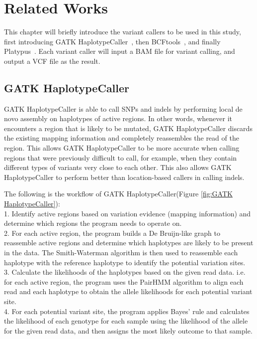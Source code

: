 \documentclass[PhD]{PHlab-thesis}
\begin{document}
\chapter{Related Works}
This chapter will briefly introduce the variant callers to be used in this study, first introducing GATK HaplotypeCaller~\cite{Poplin2018GH}, then BCFtools~\cite{Danecek2021BCFtools}, and finally Platypus~\cite{Rimmer2014Platypus}. Each variant caller will input a BAM file for variant calling, and output a VCF file as the result.
\section{GATK HaplotypeCaller}
GATK HaplotypeCaller is able to call SNPs and indels by performing local de novo assembly on haplotypes of active regions. In other words, whenever it encounters a region that is likely to be mutated, GATK HaplotypeCaller discards the existing mapping information and completely reassembles the read of the region. This allows GATK HaplotypeCaller to be more accurate when calling regions that were previously difficult to call, for example, when they contain different types of variants very close to each other. This also allows GATK HaplotypeCaller to perform better than location-based callers in calling indels.

The following is the workflow of GATK HaplotypeCaller(Figure \ref{fig:GATK HaplotypeCaller}):\\
1. Identify active regions based on variation evidence (mapping information) and determine which regions the program needs to operate on.\\
2. For each active region, the program builds a De Bruijn-like graph to reassemble active regions and determine which haplotypes are likely to be present in the data. The Smith-Waterman algorithm is then used to reassemble each haplotype with the reference haplotype to identify the potential variation sites.\\
3. Calculate the likelihoods of the haplotypes based on the given read data. i.e. for each active region, the program uses the PairHMM algorithm to align each read and each haplotype to obtain the allele likelihoods for each potential variant site.\\
4. For each potential variant site, the program applies Bayes' rule and calculates the likelihood of each genotype for each sample using the likelihood of the allele for the given read data, and then assigns the most likely outcome to that sample.
\end{document}
